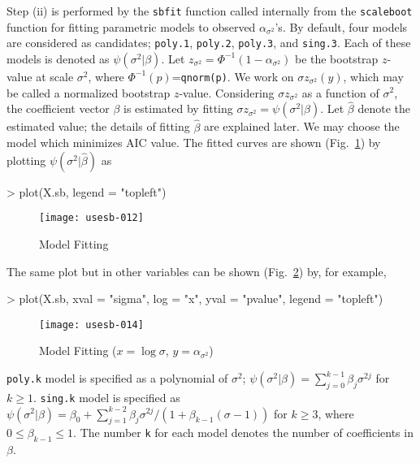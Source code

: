 \documentclass[a4paper]{amsart}
\begin{document}
Step (ii) is performed by the {\tt sbfit} function called internally
from the {\tt scaleboot} function for fitting parametric models to
observed $\alpha_{\sigma^2}$'s.  By default, four models are
considered as candidates; {\tt poly.1}, {\tt poly.2}, {\tt poly.3},
and {\tt sing.3}. Each of these models is denoted as
$\psi(\sigma^2|\beta)$. Let $z_{\sigma^2} = \Phi^{-1}( 1 -
\alpha_{\sigma^2})$ be the bootstrap $z$-value at scale $\sigma^2$,
where $\Phi^{-1}(p)$={\tt qnorm(p)}.  We work on $\sigma
z_{\sigma^2}(y)$, which may be called a normalized bootstrap
$z$-value.  Considering $\sigma z_{\sigma^2}$ as a function of
$\sigma^2$, the coefficient vector $\beta$ is estimated by fitting
$\sigma z_{\sigma^2} = \psi(\sigma^2 | \beta)$.  Let $\hat\beta$
denote the estimated value; the details of fitting $\hat\beta$ are
explained later.  We may choose the model which minimizes AIC
value. The fitted curves are shown (Fig.~\ref{fig:diag1f}) by plotting
$\psi(\sigma^2|\hat\beta)$ as
\begin{Schunk}
\begin{Sinput}
> plot(X.sb, legend = "topleft")
\end{Sinput}
\end{Schunk}
\begin{figure}
\begin{center}
\texttt{[image: usesb-012]}
\caption{Model Fitting}\label{fig:diag1f}
\end{center}
\end{figure}
The same plot but in other variables can be shown
(Fig.~\ref{fig:diag1f2}) by, for example,
\begin{Schunk}
\begin{Sinput}
> plot(X.sb, xval = "sigma", log = "x", yval = "pvalue", legend = "topleft")
\end{Sinput}
\end{Schunk}
\begin{figure}
\begin{center}
\texttt{[image: usesb-014]}
\caption{Model Fitting ($x=\log \sigma$, $y=\alpha_{\sigma^2}$)}
\label{fig:diag1f2}
\end{center}
\end{figure}



{\tt poly.k} model is specified as a polynomial of $\sigma^2$;
$\psi(\sigma^2|\beta) = \sum_{j=0}^{k-1} \beta_j \sigma^{2j}$ for
$k\ge1$.  {\tt sing.k} model is specified as $\psi(\sigma^2|\beta) =
\beta_0 + \sum_{j=1}^{k-2} \beta_j \sigma^{2j}/(1 +
\beta_{k-1}(\sigma-1))$ for $k\ge3$, where $0\le\beta_{k-1}\le1$. The
number {\tt k} for each model denotes the number of coefficients in
$\beta$.
\end{document}

